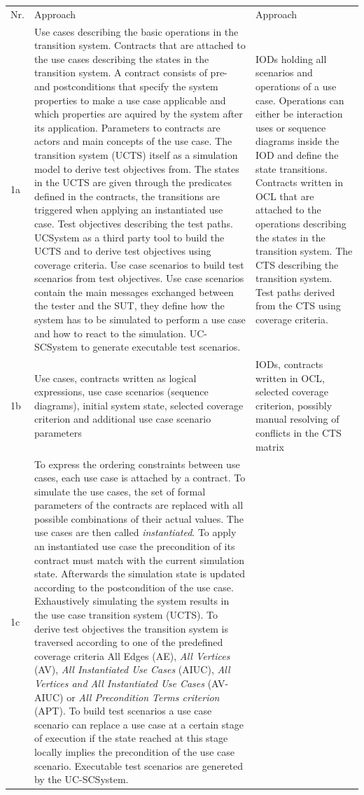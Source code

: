 \begin{longtable}[h]{p{0.5cm}p{}p{}}
	Nr. & Approach \cite{ClementineNebut2006} & Approach \cite{NajlaRaza2007} \\
	1a & 
	Use cases describing the basic operations in the transition system. Contracts that are attached to the use cases describing the states in the transition system. A contract consists of pre- and postconditions that specify the system properties to make a use case applicable and which properties are aquired by the system after its application. Parameters to contracts are actors and main concepts of the use case. The transition system (UCTS) itself as a simulation model to derive test objectives from. The states in the UCTS are given through the predicates defined in the contracts, the transitions are triggered when applying an instantiated use case. Test objectives describing the test paths. UCSystem as a third party tool to build the UCTS and to derive test objectives using coverage criteria. Use case scenarios to build test scenarios from test objectives. Use case scenarios contain the main messages exchanged between the tester and the SUT, they define how the system has to be simulated to perform a use case and how to react to the simulation. UC-SCSystem to generate executable test scenarios.  & 
	IODs holding all scenarios and operations of a use case. Operations can either be interaction uses or sequence diagrams inside the IOD and define the state transitions. Contracts written in OCL that are attached to the operations describing the states in the transition system. The CTS describing the transition system. Test paths derived from the CTS using coverage criteria.  \\
	1b & 
	Use cases, contracts written as logical expressions, use case scenarios (sequence diagrams), initial system state, selected coverage criterion and additional use case scenario parameters & 
	IODs, contracts written in OCL, selected coverage criterion, possibly manual resolving of conflicts in the CTS matrix \\
	1c &
	To express the ordering constraints between use cases, each use case is attached by a contract. To simulate the use cases, the set of formal parameters of the contracts are replaced with all possible combinations of their actual values. The use cases are then called \textit{instantiated}. To apply an instantiated use case the precondition of its contract must match with the current simulation state. Afterwards the simulation state is updated according to the postcondition of the use case. Exhaustively simulating the system results in the use case transition system (UCTS). To derive test objectives the transition system is traversed according to one of the predefined coverage criteria {All Edges} (AE), \textit{All Vertices} (AV), \textit{All Instantiated Use Cases} (AIUC), \textit{All Vertices and All Instantiated Use Cases} (AV-AIUC) or \textit{All Precondition Terms criterion} (APT). To build test scenarios a use case scenario can replace a use case at a certain stage of execution if the state reached at this stage locally implies the precondition of the use case scenario. Executable test scenarios are genereted by the UC-SCSystem. &

\end{longtable}
